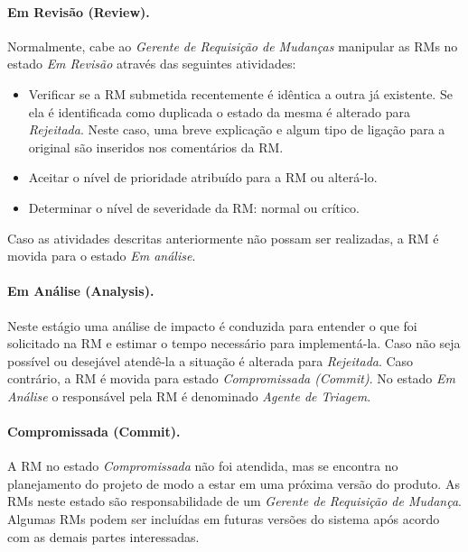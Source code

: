 \paragraph{Em Revisão (Review).}
\label{par:em_revisao}
Normalmente, cabe ao \textit{Gerente de Requisição de Mudanças} manipular as
RMs no estado \textit{Em Revisão} através das seguintes atividades:

\begin{itemize}
    \item Verificar se a RM submetida recentemente é idêntica a outra já
        existente. Se ela é identificada como duplicada o estado da mesma é
        alterado para \textit{Rejeitada}. Neste caso, uma breve explicação e
        algum tipo de ligação para a original são inseridos nos comentários da
        RM\@.
	\item Aceitar o nível de prioridade atribuído para a RM ou alterá-lo.
	\item Determinar o nível de severidade da RM\@: normal ou crítico.
\end{itemize}

Caso as atividades descritas anteriormente não possam ser re\-a\-li\-za\-das, a
RM é movida para o estado \textit{Em análise}.

\paragraph{Em Análise (Analysis).}
\label{par:em_analise}

Neste estágio uma análise de impacto é conduzida para entender o que foi
solicitado na RM e estimar o tempo necessário para implementá-la. Caso não seja
possível ou desejável atendê-la a situação é alterada para \textit{Rejeitada}.
Caso contrário, a RM é movida para estado \textit{Compromissada (Commit)}. No
estado \textit{Em Análise} o responsável pela RM é denominado \textit{Agente de
    Triagem}.

\paragraph{Compromissada (Commit).}
\label{par:commit}

A RM no estado \textit{Compromissada} não foi atendida, mas se encontra no
planejamento do projeto de modo a estar em uma próxima versão do produto. As RMs
neste estado são responsabilidade de um \textit{Gerente de Requisição de
    Mudança}. Algumas RMs podem ser incluídas em futuras versões do sistema após
acordo com as demais partes interessadas.


